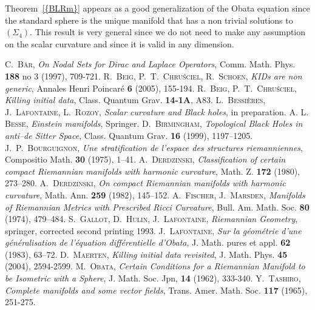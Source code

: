 \documentclass[a4paper,11pt,leqno]{amsart}
\numberwithin{equation}{section}
\theoremstyle{main}
\begin{document}
Theorem~{\ref{{BLRm}}} appears as a good generalization of the Obata equation since the standard sphere is the unique manifold that has a non trivial solutions to $(\Sigma_4)$. This result is very general since we do not need to make any assumption on the scalar curvature and since it is valid in any dimension.\\

\begin{thebibliography}{99}
\textsc{C.~Bär}, \textit{On Nodal Sets for Dirac and Laplace Operators}, Comm. Math. Phys. \textbf{188} no 3 (1997), 709-721.
\textsc{R.~Beig, P.~T.~Chru\'sciel, R.~Schoen}, \textit{KIDs are non generic}, Annales Henri Poincaré \textbf{6} (2005), 155-194.
\textsc{R.~Beig, P.~T.~Chru\'sciel}, \textit{Killing initial data}, Class. Quantum Grav. \textbf{14-1A}, A83.
\textsc{L.~Bessières, J.~Lafontaine, L.~Rozoy}, \textit{Scalar curvature and Black holes}, in preparation.
\textsc{A. L. Besse}, \textit{Einstein manifolds}, Springer.
\textsc{D.~Birmingham}, \textit{Topological Black Holes in anti--de Sitter Space}, Class. Quantum Grav. \textbf{16} (1999), 1197--1205.
\textsc{J.~P.~Bourguignon}, \textit{Une stratification de l'espace des structures riemanniennes}, Compositio Math.  \textbf{30} (1975), 1--41.
\textsc{A.~Derdzinski}, \textit{Classification of certain compact Riemannian manifolds with harmonic curvature}, Math. Z.  \textbf{172} (1980), 273--280.
\textsc{A.~Derdzinski}, \textit{On compact Riemannian manifolds with harmonic curvature}, Math. Ann.  \textbf{259} (1982), 145--152.
\textsc{A.~Fischer, J.~Marsden}, \textit{Manifolds of Riemannian Metrics with Prescribed Ricci Curvature}, Bull. Am. Math. Soc. \textbf{80} (1974), 479--484.
\textsc{S.~Gallot, D.~Hulin, J.~Lafontaine}, \textit{Riemannian Geometry}, springer, corrected second printing 1993.
\textsc{J.~Lafontaine}, \textit{Sur la géométrie d'une généralisation de l'équation différentielle d'Obata}, J. Math. pures et appl. \textbf{62} (1983), 63--72.
\textsc{D.~Maerten}, \textit{Killing initial data revisited}, J. Math. Phys. \textbf{45} (2004), 2594-2599.
\textsc{M.~Obata}, \textit{Certain Conditions for a Riemannian Manifold to be Isometric with a Sphere}, J. Math. Soc. Jpn,  \textbf{14} (1962), 333-340.
\textsc{Y.~Tashiro}, \textit{Complete manifolds and some vector fields}, Trans. Amer. Math. Soc. \textbf{117} (1965), 251-275.

\end{thebibliography}
\end{document}
